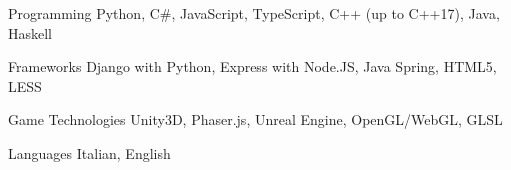 


\begin{cvskills}


\cvskill
{Programming} %
{Python, C\#, JavaScript, TypeScript, C++ (up to C++17), Java, Haskell} %


\cvskill
{Frameworks} %
{Django with Python, Express with Node.JS, Java Spring, HTML5, LESS} %


\cvskill
{Game Technologies} %
{Unity3D, Phaser.js, Unreal Engine, OpenGL/WebGL, GLSL} %


\cvskill
{Languages} %
{Italian, English} %


\end{cvskills}